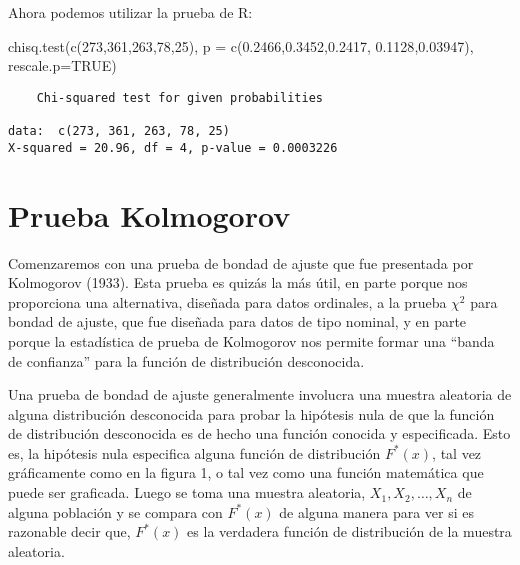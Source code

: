 \documentclass[
  a4paper,
  oneside,
  openany]{book}
\newenvironment{Shaded}{\begin{snugshade}}{\end{snugshade}}
\newcommand{\AttributeTok}[1]{\textcolor[rgb]{0.77,0.63,0.00}{#1}}
\newcommand{\ConstantTok}[1]{\textcolor[rgb]{0.00,0.00,0.00}{#1}}
\newcommand{\DecValTok}[1]{\textcolor[rgb]{0.00,0.00,0.81}{#1}}
\newcommand{\FloatTok}[1]{\textcolor[rgb]{0.00,0.00,0.81}{#1}}
\newcommand{\FunctionTok}[1]{\textcolor[rgb]{0.00,0.00,0.00}{#1}}
\newcommand{\NormalTok}[1]{#1}
\begin{document}
Ahora podemos utilizar la prueba de R:

\begin{Shaded}
\begin{Highlighting}[]
\FunctionTok{chisq.test}\NormalTok{(}\FunctionTok{c}\NormalTok{(}\DecValTok{273}\NormalTok{,}\DecValTok{361}\NormalTok{,}\DecValTok{263}\NormalTok{,}\DecValTok{78}\NormalTok{,}\DecValTok{25}\NormalTok{), }\AttributeTok{p =} \FunctionTok{c}\NormalTok{(}\FloatTok{0.2466}\NormalTok{,}\FloatTok{0.3452}\NormalTok{,}\FloatTok{0.2417}\NormalTok{,}
                                       \FloatTok{0.1128}\NormalTok{,}\FloatTok{0.03947}\NormalTok{), }\AttributeTok{rescale.p=}\ConstantTok{TRUE}\NormalTok{)}
\end{Highlighting}
\end{Shaded}

\begin{verbatim}
    Chi-squared test for given probabilities

data:  c(273, 361, 263, 78, 25)
X-squared = 20.96, df = 4, p-value = 0.0003226
\end{verbatim}

\hypertarget{prueba-kolmogorov}{%
\chapter{Prueba Kolmogorov}\label{prueba-kolmogorov}}

Comenzaremos con una prueba de bondad de ajuste que fue presentada por Kolmogorov (1933). Esta prueba es quizás la más útil, en parte porque nos proporciona una alternativa, diseñada para datos ordinales, a la prueba \(\chi^2\) para bondad de ajuste, que fue diseñada para datos de tipo nominal, y en parte porque la estadística de prueba de Kolmogorov nos permite formar una ``banda de confianza'' para la función de distribución desconocida.

Una prueba de bondad de ajuste generalmente involucra una muestra aleatoria de alguna distribución desconocida para probar la hipótesis nula de que la función de distribución desconocida es de hecho una función conocida y especificada. Esto es, la hipótesis nula especifica alguna función de distribución \(F ^*(x)\), tal vez gráficamente como en la figura 1, o tal vez como una función matemática que puede ser graficada. Luego se toma una muestra aleatoria, \(X_{1},X_{2},\ldots, X_{n}\) de alguna población y se compara con \(F^*(x)\) de alguna manera para ver si es razonable decir que, \(F^*(x)\) es la verdadera función de distribución de la muestra aleatoria.
\end{document}

